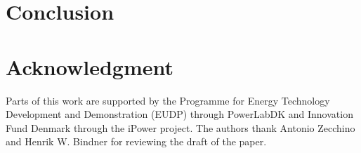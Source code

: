 \section{Conclusion}\label{sec:TSGconclusion}


\section*{Acknowledgment}
Parts of this work are supported by the Programme for Energy Technology Development and Demonstration (EUDP) through PowerLabDK and Innovation Fund Denmark through the iPower project. The authors thank Antonio Zecchino and Henrik W. Bindner for reviewing the draft of the paper.


